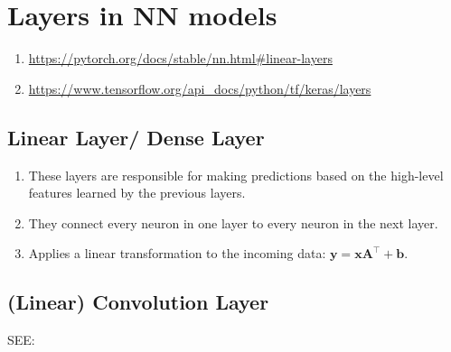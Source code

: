 \chapter{Layers in NN models}

\begin{enumerate}
    \item \url{https://pytorch.org/docs/stable/nn.html#linear-layers}
    \item \url{https://www.tensorflow.org/api_docs/python/tf/keras/layers}
\end{enumerate}


\section{Linear Layer/ Dense Layer \cite{pytorch-Linear,gfg-convolutional-neural-network-cnn-in-machine-learning}}\label{nn: Linear Layer/ Dense Layer}

\begin{enumerate}
    \item These layers are responsible for making predictions based on the high-level features learned by the previous layers. 
    
    \item They connect every neuron in one layer to every neuron in the next layer.
    
    \item Applies a linear transformation to the incoming data: $\mathbf{y=xA^\top+b}$.
\end{enumerate}




\section{(Linear) Convolution Layer \cite{gfg-convolutional-neural-network-cnn-in-machine-learning}}\label{nn: Convolution Layer}

SEE: 

